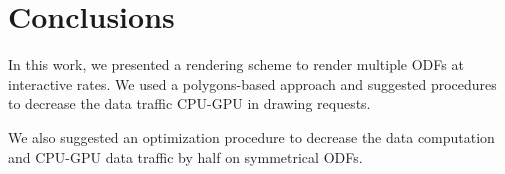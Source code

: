 \documentclass[twoside,twocolumn,10pt]{article}
\begin{document}












\section{Conclusions}
\label{sec::conclusions}

In this work, we presented a rendering scheme to render multiple ODFs at interactive rates. We used a polygons-based approach and suggested procedures to decrease the data traffic CPU-GPU in drawing requests.

We also suggested an optimization procedure to decrease the data computation and CPU-GPU data traffic by half on symmetrical ODFs.
\end{document}
